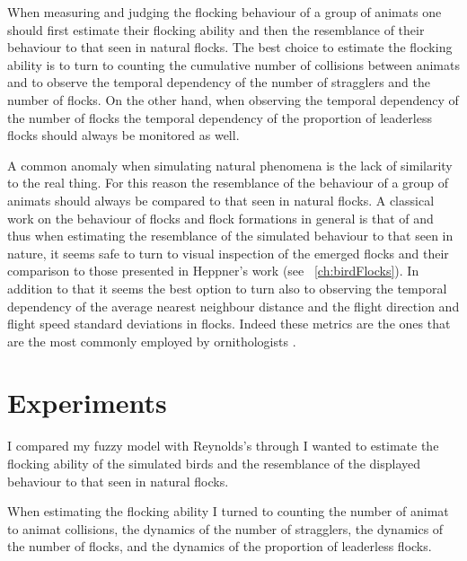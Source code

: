 When measuring and judging the flocking behaviour of a group of animats one should first estimate their flocking ability and then the resemblance of their behaviour to that seen in natural flocks. The best choice to estimate the flocking ability is to turn to counting the cumulative number of collisions between animats and to observe the temporal dependency of the number of stragglers and the number of flocks.  On the other hand, when observing the temporal dependency of the number of flocks the temporal dependency of the proportion of leaderless flocks should always be monitored as well.

A common anomaly when simulating natural phenomena is the lack of similarity to the real thing. For this reason the resemblance of the behaviour of a group of animats should always be compared to that seen in natural flocks. A classical work on the behaviour of flocks and flock formations in general is that of  and thus when estimating the resemblance of the simulated behaviour to that seen in nature, it seems safe to turn to visual inspection of the emerged flocks and their comparison to those presented in Heppner's work (see \chaptername~\ref{ch:birdFlocks}). In addition to that it seems the best option to turn also to observing the temporal dependency of the average nearest neighbour distance and the flight direction and flight speed standard deviations in flocks. Indeed these metrics are the ones that are the most commonly employed by ornithologists \cite{gould:1974,heppner:1985,pomeroy:1992}.

\section{Experiments}
\label{sec:analysis:comparison}
I compared my fuzzy model with Reynolds's through  I wanted to estimate the flocking ability of the simulated birds and the resemblance of the displayed behaviour to that seen in natural flocks.

When estimating the flocking ability I turned to counting the number of animat to animat collisions, the dynamics of the number of stragglers, the dynamics of the number of flocks, and the dynamics of the proportion of leaderless flocks.

